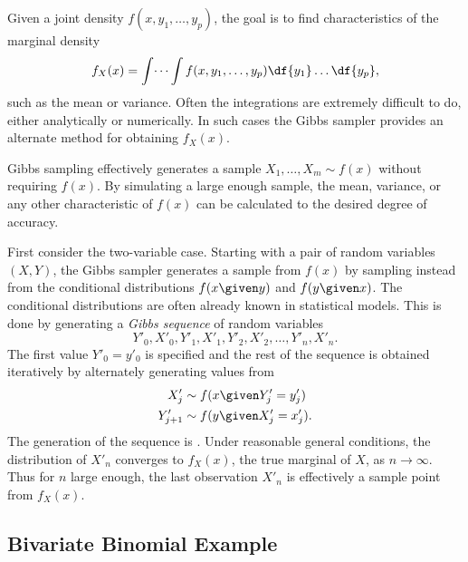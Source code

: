 \documentclass[12pt]{article}
\begin{document}
Given a joint density \( f(x, y_1, \dots, y_p) \),%
the goal is to find characteristics of the marginal density%
\[
    f_{X}(x) = \int \dots \int f(x, y_1, \dots, y_p) \df{y_1} \dots \df{y_p},
\] such as the mean or variance.  Often the integrations are extremely
difficult to do, either analytically or numerically.  In such cases the
Gibbs sampler provides an alternate method for obtaining \( f_X(x) \).

Gibbs sampling%
effectively generates a sample \( X_1, \dots, X_m \sim f(x) \) without
requiring \( f(x) \).  By simulating a large enough sample, the mean,
variance, or any other characteristic of \( f(x) \) can be calculated to
the desired degree of accuracy.

First consider the two-variable case.  Starting with a pair of random
variables \( (X, Y) \), the Gibbs sampler generates a sample from \( f(x)
\) by sampling instead from the conditional distributions \( f(x \given
y) \) and \( f(y \given x) \).  The conditional distributions are often
already known in statistical models.  This is done by generating a \emph
{Gibbs sequence}%
of random variables
\begin{equation}
    Y'_0, X'_0, Y'_1, X'_1, Y'_2, X'_2, \dots, Y'_n, X'_n.%
    \label{gibbssampler:eq:gibbsseq}
\end{equation}
The first value \( Y'_0 = y'_0 \) is specified and the rest of the
sequence is obtained iteratively by alternately generating values from
\begin{align*}
    X'_j &\sim f(x \given Y'_j = y'_j) \\
    Y'_{j+1} &\sim f(y \given X'_j = x'_j).  \\
\end{align*}
The generation of the sequence is .%
Under reasonable general conditions, the distribution of \( X'_n \)
converges to \( f_X(x) \), the true marginal of \( X \), as \( n \to
\infty \).  Thus for \( n \) large enough, the last observation \( X'_n \)
is effectively a sample point from \( f_X(x) \).

\subsection*{Bivariate Binomial Example}
\end{document}
